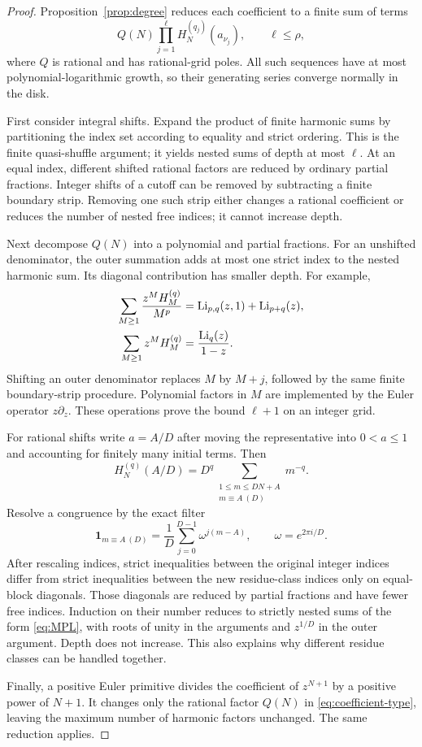 \begin{proof}
Proposition~\ref{prop:degree} reduces each coefficient to a finite sum
of terms
\begin{equation}\label{eq:coefficient-type}
 Q(N)\prod_{j=1}^{\ell}H_N^{(q_j)}(a_{\nu_j}),\qquad \ell\le\rho,
\end{equation}
where $Q$ is rational and has rational-grid poles. All such sequences
have at most polynomial-logarithmic growth, so their generating series
converge normally in the disk.

First consider integral shifts. Expand the product of finite harmonic
sums by partitioning the index set according to equality and strict
ordering. This is the finite quasi-shuffle argument; it yields nested
sums of depth at most $\ell$. At an equal index, different shifted
rational factors are reduced by ordinary partial fractions. Integer
shifts of a cutoff can be removed by subtracting a finite boundary strip.
Removing one such strip either changes a rational coefficient or reduces
the number of nested free indices; it cannot increase depth.

Next decompose $Q(N)$ into a polynomial and partial fractions. For an
unshifted denominator, the outer summation adds at most one strict
index to the nested harmonic sum. Its diagonal contribution has smaller
depth. For example,
\begin{align}
 \sum_{M\ge1}\frac{z^M H_M^{(q)}}{M^p}
    &=\operatorname{Li}_{p,q}(z,1)+\operatorname{Li}_{p+q}(z),\label{eq:basic-nesting}\\
 \sum_{M\ge1}z^M H_M^{(q)}&=\frac{\operatorname{Li}_q(z)}{1-z}.
 \label{eq:basic-harmonic-gf}
\end{align}
Shifting an outer denominator replaces $M$ by $M+j$, followed by the
same finite boundary-strip procedure. Polynomial factors in $M$ are
implemented by the Euler operator $z\partial_z$. These operations
prove the bound $\ell+1$ on an integer grid.

For rational shifts write $a=A/D$ after moving the representative
into $0<a\le1$ and accounting for finitely many initial terms.
Then
\[
 H_N^{(q)}(A/D)=D^q
    \sum_{\substack{1\le m\le DN+A\\m\equiv A\ (D)}}m^{-q}.
\]
Resolve a congruence by the exact filter
\[
 \mathbf1_{m\equiv A\ (D)}
     =\frac1D\sum_{j=0}^{D-1}\omega^{j(m-A)},
 \qquad \omega=e^{2\pi i/D}.
\]
After rescaling indices, strict inequalities between the original
integer indices differ from strict inequalities between the new
residue-class indices only on equal-block diagonals. Those diagonals
are reduced by partial fractions and have fewer free indices. Induction
on their number reduces to strictly nested sums of the form
\eqref{eq:MPL}, with roots of unity in the arguments and $z^{1/D}$
in the outer argument. Depth does not increase. This also explains
why different residue classes can be handled together.

Finally, a positive Euler primitive divides the coefficient of
$z^{N+1}$ by a positive power of $N+1$. It changes only the rational
factor $Q(N)$ in \eqref{eq:coefficient-type}, leaving the maximum
number of harmonic factors unchanged. The same reduction applies.
\end{proof}

